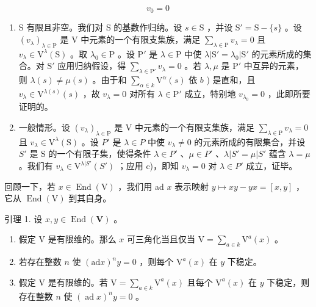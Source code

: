 \[
v _ {0} = 0
\]

\begin{enumerate}
\def\labelenumi{\alph{enumi})}
\setcounter{enumi}{2}
\item
  S 有限且非空。我们对 S 的基数作归纳。设 \(s \in \mathrm{S}\) ，并设 \(\mathrm{S}' = \mathrm{S} - \{s\}\) 。设 \((v_{\lambda})_{\lambda \in \mathrm{P}}\) 是 V 中元素的一个有限支集族，满足 \(\sum_{\lambda \in \mathrm{P}} v_{\lambda} = 0\) 且 \(v_{\lambda} \in \mathrm{V}^{\lambda}(\mathrm{S})\) 。取 \(\lambda_0 \in \mathrm{P}\) 。设 \(\mathrm{P}'\) 是 \(\lambda \in \mathrm{P}\) 中使 \(\lambda |\mathrm{S}' = \lambda_0|\mathrm{S}'\) 的元素所成的集合。对 \(\mathrm{S}'\) 应用归纳假设，得 \(\sum_{\lambda \in \mathrm{P}'} v_{\lambda} = 0\) 。若 \(\lambda, \mu\) 是 \(\mathrm{P}'\) 中互异的元素，则 \(\lambda(s) \neq \mu(s)\) 。由于和 \(\sum_{\alpha \in k} \mathrm{V}^{\alpha}(s)\) 依 \(b\) ) 是直和，且 \(v_{\lambda} \in \mathrm{V}^{\lambda(s)}(s)\) ，故 \(v_{\lambda} = 0\) 对所有 \(\lambda \in \mathrm{P}'\) 成立，特别地 \(v_{\lambda_0} = 0\) ，此即所要证明的。
\item
  一般情形。设 \((v_{\lambda})_{\lambda\in\mathrm{P}}\) 是 V 中元素的一个有限支集族，满足 \(\sum_{\lambda\in\mathrm{P}} v_{\lambda}=0\) 且 \(v_{\lambda}\in\mathrm{V}^{\lambda}(\mathrm{S})\) 。设 \(P'\) 是 \(\lambda\in P\) 中使 \(v_{\lambda}\neq0\) 的元素所成的有限集合，并设 \(S'\) 是 S 的一个有限子集，使得条件 \(\lambda\in P'\) 、\(\mu\in P'\) 、\(\lambda|S'= \mu|S'\) 蕴含 \(\lambda=\mu\) 。我们有 \(v_{\lambda}\in\mathrm{V}^{\lambda|S'}(S')\) ；应用 c)，即知 \(v_{\lambda}=0\) 对 \(\lambda\in P'\) 成立，证毕。
\end{enumerate}

回顾一下，若 \(x \in \operatorname{End}(\mathrm{V})\) ，我们用 ad \(x\) 表示映射 \(y \mapsto xy - yx = [x, y]\) ，它从 \(\operatorname{End}(\mathrm{V})\) 到其自身。

引理 1. 设 \(x, y \in \operatorname{End}(\mathbf{V})\) 。

\begin{enumerate}
\def\labelenumi{(\roman{enumi})}
\item
  假定 \(\mathrm{V}\) 是有限维的。那么 \(x\) 可三角化当且仅当 \(\mathrm{V} = \sum_{a\in k}\mathrm{V}^a (x)\) 。
\item
  若存在整数 \(n\) 使 \((\mathrm{ad}x)^n y = 0\) ，则每个 \(\mathrm{V}^a(x)\) 在 \(y\) 下稳定。
\item
  假定 \(\mathrm{V}\) 是有限维的。若 \(\mathrm{V} = \sum_{a \in k} \mathrm{V}^a(x)\) 且每个 \(\mathrm{V}^a(x)\) 在 \(y\) 下稳定，则存在整数 \(n\) 使 \((\operatorname{ad} x)^n y = 0\) 。
\end{enumerate}

